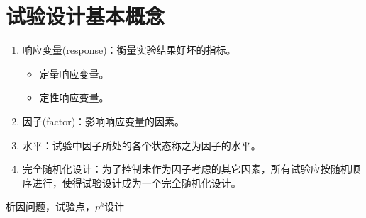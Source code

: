 \chapter{试验设计基本概念}

\begin{enumerate}
	\item 响应变量(response)：衡量实验结果好坏的指标。
	\begin{itemize}
		\item 定量响应变量。
		\item 定性响应变量。
	\end{itemize}
	\item 因子(factor)：影响响应变量的因素。
	\item 水平：试验中因子所处的各个状态称之为因子的水平。
	\item 完全随机化设计：为了控制未作为因子考虑的其它因素，所有试验应按随机顺序进行，使得试验设计成为一个完全随机化设计。
\end{enumerate}
析因问题，试验点，$p^k$设计